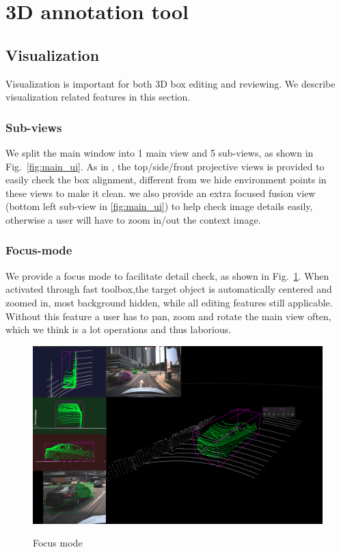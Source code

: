\documentclass[letterpaper, 10 pt, conference]{ieeeconf}  %
\begin{document}
\section{3D annotation tool}
\label{3D annotation tool}



\subsection{Visualization}

Visualization is important for both 3D box editing and reviewing. We describe visualization related features in this section.

\subsubsection{Sub-views}
\label{section:sub-views}
We split the main window into 1 main view and 5 sub-views, as shown in Fig.~\ref{fig:main_ui}. As in \cite{Zimmer20193DBA, more..}, the top/side/front projective views is provided to easily check the box alignment, different from \cite{Zimmer20193DBA} we hide environment points in these views to make it clean. we also provide an extra focused fusion view (bottom left sub-view in \ref{fig:main_ui}) to help check image details easily, otherwise a user will have to zoom in/out the context image.

\subsubsection{Focus-mode}
We provide a focus mode to facilitate detail check, as shown in Fig.~\ref{fig:focus-mode}. When activated through fast toolbox,the target object is automatically centered and zoomed in, most background hidden, while all editing features still applicable. Without this feature a user has to pan,  zoom and rotate the main view often, which we think is a lot operations and thus laborious.

\begin{figure}[!th]
	\centering	
	\includegraphics[width=0.9\linewidth]{./figures/focus-mode}\\
	\caption{Focus mode}
	\label{fig:focus-mode}
\end{figure}
\end{document}
